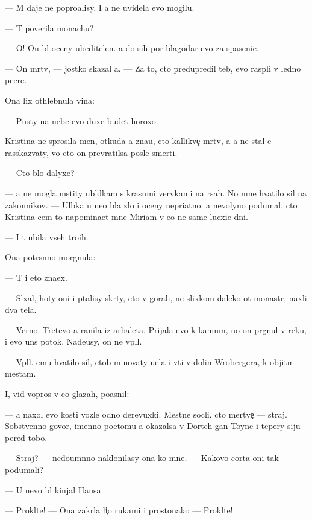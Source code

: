 \documentclass[10pt]{book}
\begin{document}
— M{\yi} daje ne popro{\x}alisy. I {\y}a ne uvidela {\y}evo mogilu.

— T{\yi} poverila monachu?

— O! On b{\yi}l oceny ubeditelen. {\Y}a do sih por blagodar{\io} {\y}evo za spaseni{\y}e.

— On m{\e}rtv, — jostko skazal {\y}a. — Za to, cto predupredil teb{\ia}, {\y}evo rasp{\ia}li v led{\ia}no{\y} pe{\x}ere.

Ona lix othlebnula vina:

— Pusty na nebe {\y}evo duxe budet horoxo.

Kristina ne sprosila men{\ia}, otkuda {\y}a zna{\y}u, cto kallikve{\c} m{\e}rtv, a {\y}a ne stal {\y}e{\y} rasskaz{\yi}vaty, vo cto on prevratilsa posle smerti.

— Cto b{\yi}lo dalyxe?

— {\Y}a ne mogla mstity ubl{\io}dkam s krasn{\yi}mi ver{\e}vkami na r{\ia}sah. No mne hvatilo sil na zakonnikov. — Ul{\yi}bka u ne{\y}o b{\yi}la zlo{\y} i oceny nepri{\y}atno{\y}. {\Y}a nevolyno podumal, cto Kristina cem-to napomina{\y}et mne Mi\-ri\-am v {\y}e{\y}o ne sam{\yi}{\y}e lucxi{\y}e dni.

— I t{\yi} ubila vseh tro{\y}ih.

Ona potr{\ia}s{\e}nno morgnula:

— T{\yi} i eto zna\-{\y}ex.

— Sl{\yi}xal, hoty oni i p{\yi}talisy skr{\yi}\-ty, cto v gorah, ne slixkom daleko ot monast{\yi}r{\ia}, naxli dva tela.

— Verno. Tret{\y}evo {\y}a ranila iz arbaleta. Prijala {\y}evo k kamn{\ia}m, no on pr{\yi}gnul v reku, i {\y}evo un{\e}s potok. Nade{\y}usy, on ne v{\yi}pl{\yi}l.

— V{\yi}pl{\yi}l. {\Y}emu hvatilo sil, ctob{\yi} minovaty u{\x}el{\y}a i v{\yi}{\y}ti v dolin{\yi} Wrobergera, k objit{\yi}m mestam.

I, vid{\ia} vopros v {\y}e{\y}o glazah, po{\y}asnil:

— {\Y}a naxol {\y}evo kosti voz\-le odno{\y} derevuxki. Mestn{\yi}{\y}e socli, cto mertve{\c} — straj. Sobstvenno go\-vo\-r{\ia}, imenno poetomu {\y}a okazalsa v Dortch-gan-Toyne i tepery siju pered tobo{\y}.

— Straj? — nedoum{\e}nno naklonilasy ona ko mne. — Kakovo corta oni tak podumali?

— U nevo b{\yi}l kinjal Hansa.

— Prokl{\ia}t{\y}e! — Ona zakr{\yi}la li{\c}o rukami i prostonala: — Prokl{\ia}t{\y}e!
\end{document}
